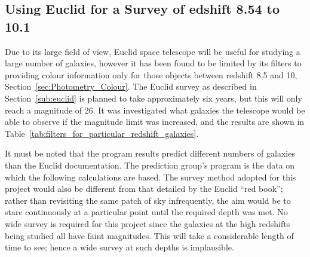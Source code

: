 
\subsection{Using Euclid for a Survey of edshift 8.54 to 10.1} %
\label{sub:using_euclid_for_a_survey_of_edshift_8_54_to_10_1}
	Due to its large field of view, Euclid space telescope will be useful for studying a large number of galaxies, however it has been found to be limited by its filters to providing colour information only for those objects between redshift 8.5 and 10, Section~\ref{sec:Photometry_Colour}. The Euclid survey as described in Section~\ref{sub:euclid} is planned to take approximately six years, but this will only reach a magnitude of 26. It was investigated what galaxies the telescope would be able to observe if the magnitude limit was increased, and the results are shown in Table~\ref{tab:filters_for_particular_redshift_galaxies}.

	It must be noted that the program results predict different numbers of galaxies than the Euclid documentation. The prediction group’s program is the data on which the following calculations are based. The survey method adopted for this project would also be different from that detailed by the Euclid ``red book''; rather than revisiting the same patch of sky infrequently, the aim would be to stare continuously at a particular point until the required depth was met. No wide survey is required for this project since the galaxies at the high redshifts being studied all have faint magnitudes. This will take a considerable length of time to see; hence a wide survey at such depths is implausible.

